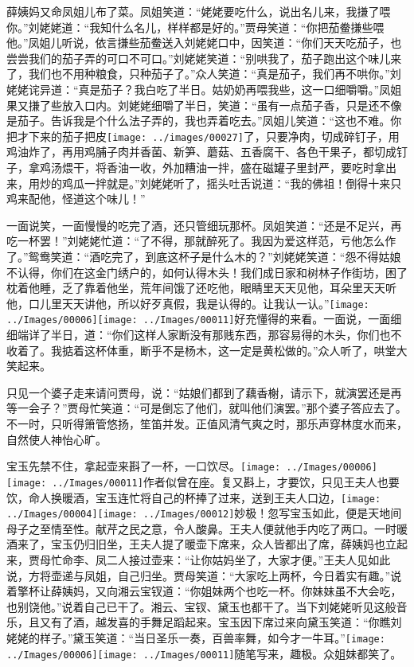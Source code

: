 薛姨妈又命凤姐儿布了菜。凤姐笑道：``姥姥要吃什么，说出名儿来，我搛了喂你。''刘姥姥道：``我知什么名儿，样样都是好的。''贾母笑道：``你把茄鲞搛些喂他。''凤姐儿听说，依言搛些茄鲞送入刘姥姥口中，因笑道：``你们天天吃茄子，也尝尝我们的茄子弄的可口不可口。''刘姥姥笑道：``别哄我了，茄子跑出这个味儿来了，我们也不用种粮食，只种茄子了。''众人笑道：``真是茄子，我们再不哄你。''刘姥姥诧异道：``真是茄子？我白吃了半日。姑奶奶再喂我些，这一口细嚼嚼。''凤姐果又搛了些放入口内。刘姥姥细嚼了半日，笑道：``虽有一点茄子香，只是还不像是茄子。告诉我是个什么法子弄的，我也弄着吃去。''凤姐儿笑道：``这也不难。你把才下来的茄子把皮\texttt{[image: ../images/00027]}了，只要净肉，切成碎钉子，用鸡油炸了，再用鸡脯子肉并香菌、新笋、蘑菇、五香腐干、各色干果子，都切成钉子，拿鸡汤煨干，将香油一收，外加糟油一拌，盛在磁罐子里封严，要吃时拿出来，用炒的鸡瓜一拌就是。''刘姥姥听了，摇头吐舌说道：``我的佛祖！倒得十来只鸡来配他，怪道这个味儿！''

一面说笑，一面慢慢的吃完了酒，还只管细玩那杯。凤姐笑道：``还是不足兴，再吃一杯罢！''刘姥姥忙道：``了不得，那就醉死了。我因为爱这样范，亏他怎么作了。''鸳鸯笑道：``酒吃完了，到底这杯子是什么木的？''刘姥姥笑道：``怨不得姑娘不认得，你们在这金门绣户的，如何认得木头！我们成日家和树林子作街坊，困了枕着他睡，乏了靠着他坐，荒年间饿了还吃他，眼睛里天天见他，耳朵里天天听他，口儿里天天讲他，所以好歹真假，我是认得的。让我认一认。''{\texttt{[image: ../Images/00006]}\texttt{[image: ../Images/00011]}\footnotesize \kaishu 好充懂得的来看。}一面说，一面细细端详了半日，道：``你们这样人家断没有那贱东西，那容易得的木头，你们也不收着了。我掂着这杯体重，断乎不是杨木，这一定是黄松做的。''众人听了，哄堂大笑起来。

只见一个婆子走来请问贾母，说：``姑娘们都到了藕香榭，请示下，就演罢还是再等一会子？''贾母忙笑道：``可是倒忘了他们，就叫他们演罢。''那个婆子答应去了。不一时，只听得箫管悠扬，笙笛并发。正值风清气爽之时，那乐声穿林度水而来，自然使人神怡心旷。

宝玉先禁不住，拿起壶来斟了一杯，一口饮尽。{\texttt{[image: ../Images/00006]}\texttt{[image: ../Images/00011]}\footnotesize \kaishu 作者似曾在座。}复又斟上，才要饮，只见王夫人也要饮，命人换暖酒，宝玉连忙将自己的杯捧了过来，送到王夫人口边，{\texttt{[image: ../Images/00004]}\texttt{[image: ../Images/00012]}\footnotesize \kaishu 妙极！忽写宝玉如此，便是天地间母子之至情至性。献芹之民之意，令人酸鼻。}王夫人便就他手内吃了两口。一时暖酒来了，宝玉仍归旧坐，王夫人提了暖壶下席来，众人皆都出了席，薛姨妈也立起来，贾母忙命李、凤二人接过壶来：``让你姑妈坐了，大家才便。''王夫人见如此说，方将壶递与凤姐，自己归坐。贾母笑道：``大家吃上两杯，今日着实有趣。''说着擎杯让薛姨妈，又向湘云宝钗道：``你姐妹两个也吃一杯。你妹妹虽不大会吃，也别饶他。''说着自己已干了。湘云、宝钗、黛玉也都干了。当下刘姥姥听见这般音乐，且又有了酒，越发喜的手舞足蹈起来。宝玉因下席过来向黛玉笑道：``你瞧刘姥姥的样子。''黛玉笑道：``当日圣乐一奏，百兽率舞，如今才一牛耳。''{\texttt{[image: ../Images/00006]}\texttt{[image: ../Images/00011]}\footnotesize \kaishu 随笔写来，趣极。}众姐妹都笑了。

